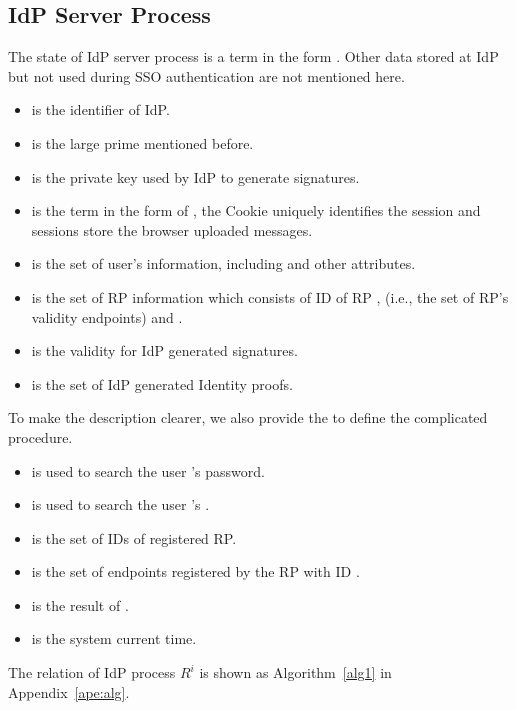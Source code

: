 \begin{appendices}
\subsection{IdP Server Process}
The state of IdP server process is a term in the form . Other data stored at IdP but not used during SSO authentication are not mentioned here.
\begin{itemize}
\item {} is the identifier of IdP.
\item {} is the large prime mentioned before.
\item {} is the private key used by IdP to generate signatures.
\item {} is the term in the form of , the Cookie uniquely identifies the session and sessions store the  browser uploaded messages.
\item {} is the set of user's information, including    and other attributes.
\item {} is the set of RP information which consists of ID of RP ,  (i.e., the set of RP's validity endpoints) and .
\item {} is the validity for IdP generated signatures.
\item {} is the set of IdP generated Identity proofs.
\end{itemize}
To make the description clearer, we also provide the  to define the complicated procedure.
\begin{itemize}
\item {} is used to search the user 's password.
\item {} is used to search the user 's .
\item {} is the set of IDs of registered RP.
\item {} is the set of endpoints registered by the RP with ID .
\item {} is the result of .
\item {} is the system current time.
\end{itemize}

The relation of IdP process $R^i$ is shown as Algorithm~\ref{alg1} in Appendix~\ref{ape:alg}.






\end{appendices}
